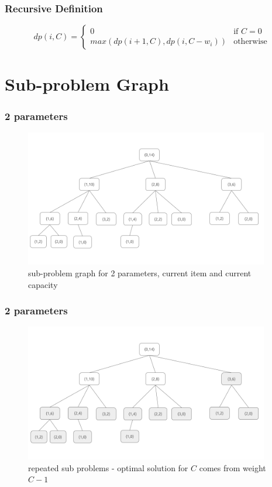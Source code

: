 \documentclass{beamer}
\begin{document}
\begin{frame}
	\frametitle{Recursive Definition}
	\[
		dp(i, C) = \begin{cases}
					0 & \text{if }  C = 0 \\
					max(dp(i+1, C), dp(i, C-w_i)) & \text{otherwise} 
				\end{cases}
	\]
\end{frame}

\section{Sub-problem Graph}
\begin{frame}
	\frametitle{2 parameters}
	\begin{figure}
		\centering
		\includegraphics[width=0.95\textwidth]{asset/1.png}
		\caption{sub-problem graph for 2 parameters, current item and current capacity}
	\end{figure}	
\end{frame}

\begin{frame}
	\frametitle{2 parameters}
	\begin{figure}
		\centering
		\includegraphics[width=0.95\textwidth]{asset/2.png}
		\caption{repeated sub problems - optimal solution for \( C \) comes from weight \( C-1 \) }
	\end{figure}	
\end{frame}
\end{document}
